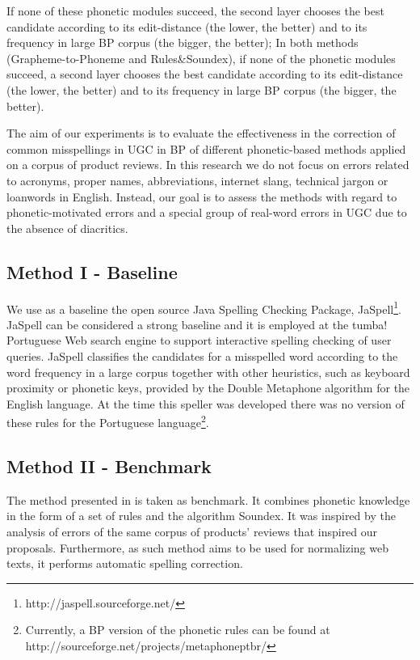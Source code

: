 If none of these phonetic modules succeed, the second layer chooses the best candidate according to its edit-distance (the lower, the better) and to its frequency in large BP corpus (the bigger, the better); 
In both methods (Grapheme-to-Phoneme and Rules\&Soundex), if none of the phonetic modules succeed, a second layer chooses the best candidate according to its edit-distance (the lower, the better) and to its frequency in large BP corpus (the bigger, the better).

The aim of our experiments is to evaluate the effectiveness in the correction of common misspellings in UGC in BP of different phonetic-based methods applied on a corpus of product reviews. In this research we do not focus on errors related to acronyms, proper names, abbreviations, internet slang, technical jargon or loanwords in English. Instead, our goal is to assess the methods with regard to  phonetic-motivated errors and a special group of real-word errors in UGC due to the absence of diacritics.

\subsection{Method I - Baseline}

We use as a baseline the open source Java Spelling Checking Package, JaSpell\footnote {http://jaspell.sourceforge.net/}. JaSpell can be  considered a strong baseline and it is  employed at the tumba! Portuguese Web search engine to support interactive spelling checking of user queries. 
JaSpell classifies the candidates for a misspelled word according to the word frequency in a large corpus together with other heuristics, such as keyboard proximity or phonetic keys, provided by the Double Metaphone algorithm \cite{2000double} for the English language. At the time this speller was developed there was no version of these rules for the Portuguese language\footnote{Currently, a BP version of the phonetic rules can be found at http://sourceforge.net/projects/metaphoneptbr/}. 

\subsection{Method II - Benchmark}

The method presented in \cite{Avanco2014} is taken as benchmark. It combines phonetic knowledge in the form of a set of rules and the algorithm Soundex. It was inspired by the analysis of errors of the same corpus of products' reviews \cite{Hartmann2014} that inspired our proposals. Furthermore, as such method aims to be used for normalizing web texts, it performs automatic spelling correction. 

